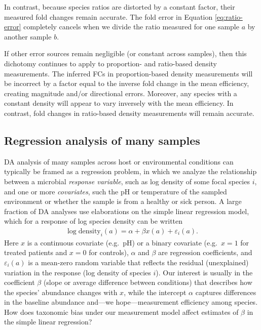 \documentclass[
]{article}
\begin{document}
In contrast, because species ratios are distorted by a constant factor, their measured fold changes remain accurate.
The fold error in Equation \eqref{eq:ratio-error} completely cancels when we divide the ratio measured for one sample \(a\) by another sample \(b\).

If other error sources remain negligible (or constant across samples), then this dichotomy continues to apply to proportion- and ratio-based density measurements.
The inferred FCs in proportion-based density measurements will be incorrect by a factor equal to the inverse fold change in the mean efficiency, creating magnitude and/or directional errors.
Moreover, any species with a constant density will appear to vary inversely with the mean efficiency.
In contrast, fold changes in ratio-based density measurements will remain accurate.

\hypertarget{regression-analysis-of-many-samples}{%
\subsection{Regression analysis of many samples}\label{regression-analysis-of-many-samples}}

DA analysis of many samples across host or environmental conditions can typically be framed as a regression problem, in which we analyze the relationship between a microbial \emph{response variable}, such as log density of some focal species \(i\), and one or more \emph{covariates}, such the pH or temperature of the sampled environment or whether the sample is from a healthy or sick person.
A large fraction of DA analyses use elaborations on the simple linear regression model, which for a response of log species density can be written
\begin{align}
  \label{eq:regression}
  \log \text{density}_i(a) = \alpha + \beta x(a) + \varepsilon_i(a).
\end{align}
Here \(x\) is a continuous covariate (e.g.~pH) or a binary covariate (e.g.~\(x=1\) for treated patients and \(x=0\) for controls), \(\alpha\) and \(\beta\) are regression coefficients, and \(\varepsilon_i(a)\) is a mean-zero random variable that reflects the residual (unexplained) variation in the response (log density of species \(i\)).
Our interest is usually in the coefficient \(\beta\) (slope or average difference between conditions) that describes how the species' abundance changes with \(x\), while the intercept \(\alpha\) captures differences in the baseline abundance and---we hope---measurement efficiency among species.
How does taxonomic bias under our measurement model affect estimates of \(\beta\) in the simple linear regression?
\end{document}
